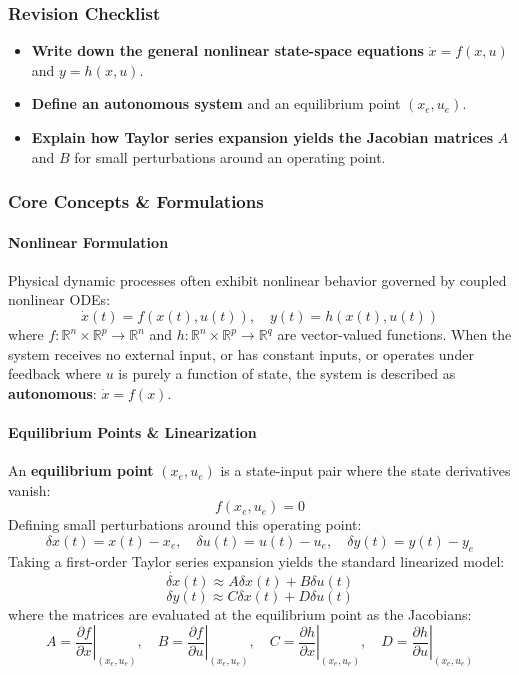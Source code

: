 \documentclass[12pt,onecolumn,twoside ]{article}
\begin{document}
	\subsubsection{Revision Checklist}
	\begin{itemize}
		\item[$\square$]
		\textbf{Write down the general nonlinear state-space equations} $\dot{x} = f(x, u)$ and $y = h(x, u)$.
		\item[$\square$]
		\textbf{Define an autonomous system} and an equilibrium point $(x_e, u_e)$.
		\item[$\square$]
		\textbf{Explain how Taylor series expansion yields the Jacobian matrices} $A$ and $B$ for small perturbations around an operating point.
	\end{itemize}
	
	\subsubsection{Core Concepts \& Formulations}
	\paragraph{Nonlinear Formulation}
	Physical dynamic processes often exhibit nonlinear behavior governed by coupled nonlinear ODEs: \[
	\dot{x}(t) = f(x(t), u(t)), \quad y(t) = h(x(t), u(t))
	\] where $f: \mathbb{R}^n \times \mathbb{R}^p \to \mathbb{R}^n$ and $h: \mathbb{R}^n \times \mathbb{R}^p \to \mathbb{R}^q$ are vector-valued functions. When the system receives no external input, or has constant inputs, or operates under feedback where $u$ is purely a function of state, the system is described as \textbf{autonomous}: $\dot{x} = f(x)$.
	\paragraph{Equilibrium Points \& Linearization}
	An \textbf{equilibrium point} $(x_e, u_e)$ is a state-input pair where the state derivatives vanish: \[
	f(x_e, u_e) = 0
	\]
	Defining small perturbations around this operating point: \[
	\delta x(t) = x(t) - x_e, \quad \delta u(t) = u(t) - u_e, \quad \delta y(t) = y(t) - y_e
	\] Taking a first-order Taylor series expansion yields the standard linearized model: \[
	\dot{\delta x}(t) \approx A \delta x(t) + B \delta u(t)
	\] \[
	\delta y(t) \approx C \delta x(t) + D \delta u(t)
	\] where the matrices are evaluated at the equilibrium point as the Jacobians: \[
	A = \left. \frac{\partial f}{\partial x} \right|_{(x_e, u_e)}, \quad B = \left. \frac{\partial f}{\partial u} \right|_{(x_e, u_e)}, \quad C = \left. \frac{\partial h}{\partial x} \right|_{(x_e, u_e)}, \quad D = \left. \frac{\partial h}{\partial u} \right|_{(x_e, u_e)}
	\]
	
\end{document}
